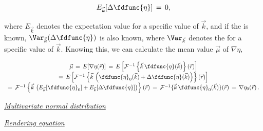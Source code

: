 {\begin{equation}
E_{\vec{k}}[\Delta\fdfunc{\eta}] \,=\, 0,
\end{equation}

where $E_{\vec{k}}$ denotes the expectation value for a specific value of $\vec{k}$, and if the  is known, $\Var_{\vec{k}}(\Delta\fdfunc{\eta})$ is also known, where $\Var_{\vec{k}}$ denotes the \variance for a specific value of $\vec{k}$. Knowing this, we can calculate the mean value $\vec{\mu}$ of $\nabla\eta$,

\begin{equation}
\begin{array}{c}
\vec{\mu} \,=\, E[\nabla\eta(\vec{r})] \,=\, E\left[\mathcal{F}^{-1}\left\{\vec{k}\,\fdfunc{\eta}(\vec{k})\right\}(\vec{r})\right] \\
=\, E\left[\mathcal{F}^{-1}\left\{\vec{k}\,\left(\fdfunc{\eta}_0(\vec{k})+\Delta\fdfunc{\eta}(\vec{k})\right)\right\}(\vec{r})\right] \\
=\, \mathcal{F}^{-1}\left\{\vec{k}\,\left(E_{\vec{k}}[\fdfunc{\eta}_0]+E_{\vec{k}}[\Delta\fdfunc{\eta}]\right)\right\}(\vec{r}) \,=\, \mathcal{F}^{-1}\{\vec{k}\,\fdfunc{\eta}_0(\vec{k})\}(\vec{r}) \,=\, \nabla\eta_0(\vec{r})\,.
\end{array}
\end{equation}

\textit{\href{http://en.wikipedia.org/wiki/Multivariate\_normal\_distribution\#Non-degenerate\_case}{Multivariate normal distribution}}

\textit{\href{http://en.wikipedia.org/wiki/Rendering\_equation}{Rendering equation}}
}